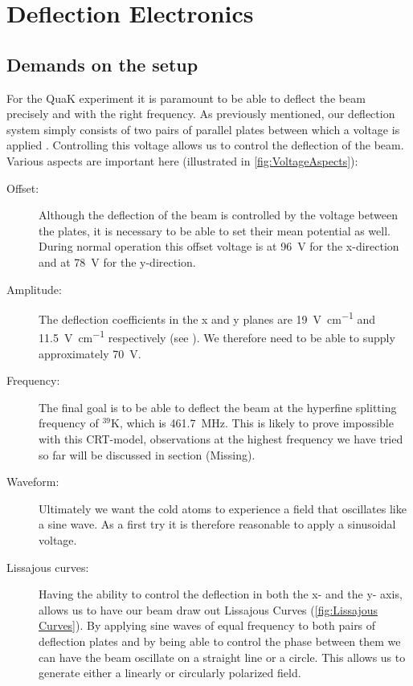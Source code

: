 
\chapter{Deflection Electronics}

\section{Demands on the setup}
For the QuaK experiment it is paramount to be able to deflect the beam precisely and with the right frequency. 
As previously mentioned, our deflection system simply consists of two pairs of parallel plates between which a voltage is applied . Controlling this voltage allows us to control the deflection of the beam. Various aspects are important here (illustrated in \cref{fig:VoltageAspects}):

\begin{description}
	\item[Offset:] Although the deflection of the beam is controlled by the voltage between the plates, it is necessary to be able to set their mean potential as well. During normal operation this offset voltage is at \SI{96}{\volt} for the x-direction and at \SI{78}{\volt} for the y-direction.
	
	\item[Amplitude:] The deflection coefficients in the x and y planes are \SI{19}{\volt\per\centi\meter} and \SI{11.5}{\volt\per\centi\meter} respectively (see \cite{D14363GY123-manual}). We therefore need to be able to supply approximately \SI{70}{\volt}.
	
	\item[Frequency:] The final goal is to be able to deflect the beam at the hyperfine splitting frequency of $^{39}\mathrm{K}$, which is \SI{461.7}{\mega\hertz}. This is likely to prove impossible with this CRT-model, observations at the highest frequency we have tried so far will be discussed in section (Missing).
	
	\item[Waveform:] Ultimately we want the cold atoms to experience a field that oscillates like a sine wave. As a first try it is therefore reasonable to apply a sinusoidal voltage.
	
	\item[Lissajous curves:] Having the ability to control the deflection in both the x- and the y- axis, allows us to have our beam draw out Lissajous Curves (\cref{fig:Lissajous Curves}). By applying sine waves of equal frequency to both pairs of deflection plates and by being able to control the phase between them we can have the beam oscillate on a straight line or a circle. This allows us to generate either a linearly or circularly polarized field.
\end{description}


